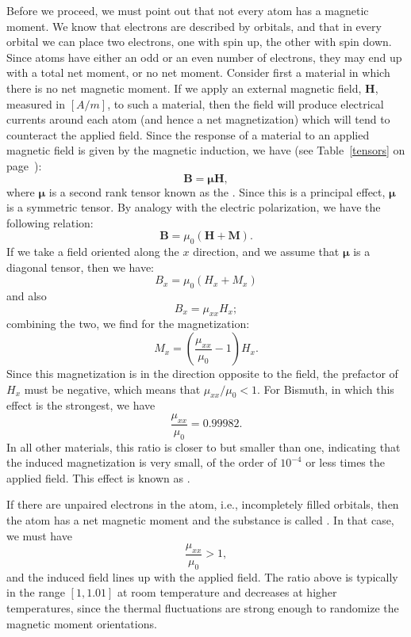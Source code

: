 Before we proceed, we must point out that not every atom has a magnetic moment.  We know that electrons are described by orbitals, and that in every orbital we can place two electrons, one with spin up, the other with spin down.  Since atoms have either an odd or an even number of electrons, they may end up with a total net moment, or no net moment.  Consider first a material in which there is no net magnetic moment.  If we apply an external magnetic field, $\mathbf{H}$, measured in $[A/m]$, to such a material, then the field will produce electrical currents around each atom (and hence a net magnetization) which will tend to counteract the applied field.  Since the response of a material to an applied magnetic field is given by the magnetic induction, we have (see Table~\ref{tensors} on page~\pageref{tensors}):
\begin{equation}
	\mathbf{B} = \bm{\mu}  \mathbf{H},
\end{equation}
where $\bm{\mu}$ is a second rank tensor known as the .  Since this is  a principal effect, $\bm{\mu}$ is a symmetric tensor.  By analogy with the electric polarization, we have the following relation:
\begin{equation}
	\mathbf{B} = \mu_0(\mathbf{H}+\mathbf{M}).
\end{equation}
If we take a field oriented along the $x$ direction, and we assume that $\bm{\mu}$ is a diagonal tensor, then we have:
\[
	B_x = \mu_0(H_x+M_x)
\]
and also
\[
	B_x = \mu_{xx} H_x;
\]
combining the two, we find for the magnetization:
\[
	M_x = \left(\frac{\mu_{xx}}{\mu_0}-1\right)H_x.
\]
Since this magnetization is in the direction opposite to the field, the prefactor of $H_x$ must be negative, which means that $\mu_{xx}/\mu_0 < 1$.  For Bismuth, in which this effect is the strongest, we have
\[
	\frac{\mu_{xx}}{\mu_0} = 0.99982.
\]
In all other materials, this ratio is closer to but smaller than one, indicating that the induced magnetization is very small, of the order of $10^{-4}$ or less times the applied field.  This effect is known as .

If there are unpaired electrons in the atom, i.e., incompletely filled orbitals, then the atom has a net magnetic moment and the substance is called .  In that case, we must have
\[
	\frac{\mu_{xx}}{\mu_0} > 1,
\]
and the induced field lines up with the applied field.  The ratio above is typically in the range $[1,1.01]$ at room temperature and decreases at higher temperatures, since the thermal fluctuations are strong enough to randomize the magnetic moment orientations.

